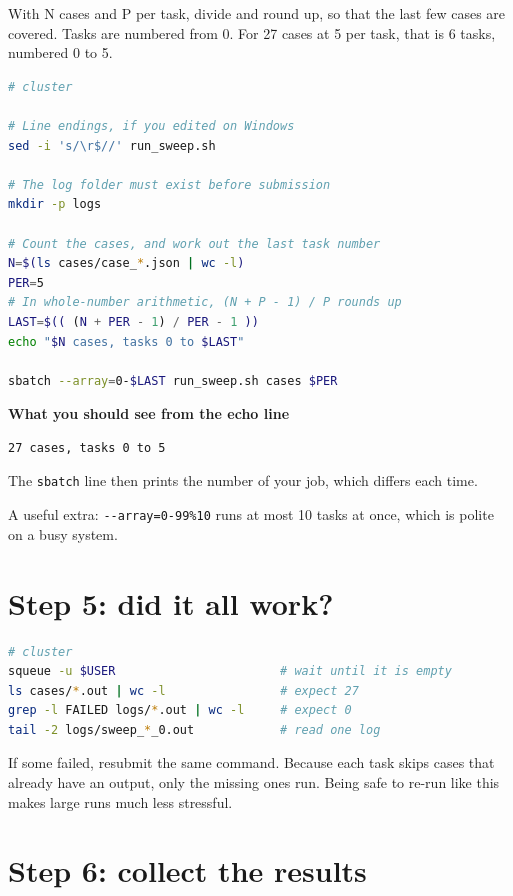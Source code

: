 With N cases and P per task, divide and round up, so that the last few cases are covered. Tasks are numbered from 0. For 27 cases at 5 per task, that is 6 tasks, numbered 0 to 5.

\begin{lstlisting}[language=bash]
# cluster

# Line endings, if you edited on Windows
sed -i 's/\r$//' run_sweep.sh

# The log folder must exist before submission
mkdir -p logs

# Count the cases, and work out the last task number
N=$(ls cases/case_*.json | wc -l)
PER=5
# In whole-number arithmetic, (N + P - 1) / P rounds up
LAST=$(( (N + PER - 1) / PER - 1 ))
echo "$N cases, tasks 0 to $LAST"

sbatch --array=0-$LAST run_sweep.sh cases $PER
\end{lstlisting}

\textbf{What you should see from the echo line}

\begin{lstlisting}[language=text]
27 cases, tasks 0 to 5
\end{lstlisting}

The \texttt{sbatch} line then prints the number of your job, which differs each time.

A useful extra: \texttt{-\/-array=0-99\%10} runs at most 10 tasks at once, which is polite on a busy system.

\section{Step 5: did it all work?}\label{step-5-did-it-all-work}

\begin{lstlisting}[language=bash]
# cluster
squeue -u $USER                       # wait until it is empty
ls cases/*.out | wc -l                # expect 27
grep -l FAILED logs/*.out | wc -l     # expect 0
tail -2 logs/sweep_*_0.out            # read one log
\end{lstlisting}

If some failed, resubmit the same command. Because each task skips cases that already have an output, only the missing ones run. Being safe to re-run like this makes large runs much less stressful.

\section{Step 6: collect the results}\label{step-6-collect-the-results}

